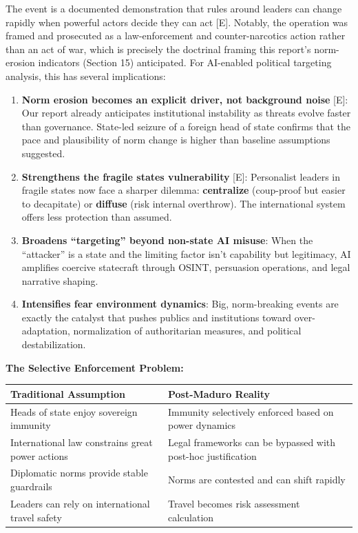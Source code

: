 \documentclass[11pt,letterpaper]{article}
\begin{document}
\begin{criticalbox}
The event is a documented demonstration that rules around leaders can change rapidly when powerful actors decide they can act [E]. Notably, the operation was framed and prosecuted as a law-enforcement and counter-narcotics action rather than an act of war, which is precisely the doctrinal framing this report's norm-erosion indicators (Section 15) anticipated. For AI-enabled political targeting analysis, this has several implications:

\begin{enumerate}
  \item \textbf{Norm erosion becomes an explicit driver, not background noise} [E]: Our report already anticipates institutional instability as threats evolve faster than governance. State-led seizure of a foreign head of state confirms that the pace and plausibility of norm change is higher than baseline assumptions suggested.
  \item \textbf{Strengthens the fragile states vulnerability} [E]: Personalist leaders in fragile states now face a sharper dilemma: \textbf{centralize} (coup-proof but easier to decapitate) or \textbf{diffuse} (risk internal overthrow). The international system offers less protection than assumed.
  \item \textbf{Broadens ``targeting'' beyond non-state AI misuse}: When the ``attacker'' is a state and the limiting factor isn't capability but legitimacy, AI amplifies coercive statecraft through OSINT, persuasion operations, and legal narrative shaping.
  \item \textbf{Intensifies fear environment dynamics}: Big, norm-breaking events are exactly the catalyst that pushes publics and institutions toward over-adaptation, normalization of authoritarian measures, and political destabilization.
\end{enumerate}
\end{criticalbox}

\textbf{The Selective Enforcement Problem:}

\begin{center}
\small
\begin{tabular}{L{5.5cm}L{6.5cm}}
\toprule
\textbf{Traditional Assumption} & \textbf{Post-Maduro Reality} \\
\midrule
Heads of state enjoy sovereign immunity & Immunity selectively enforced based on power dynamics \\
International law constrains great power actions & Legal frameworks can be bypassed with post-hoc justification \\
Diplomatic norms provide stable guardrails & Norms are contested and can shift rapidly \\
Leaders can rely on international travel safety & Travel becomes risk assessment calculation \\
\bottomrule
\end{tabular}
\end{center}
\end{document}
